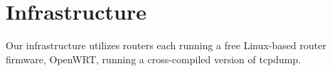 \section{Infrastructure}
Our infrastructure utilizes routers each running a free Linux-based router firmware, OpenWRT, running a cross-compiled version of tcpdump.